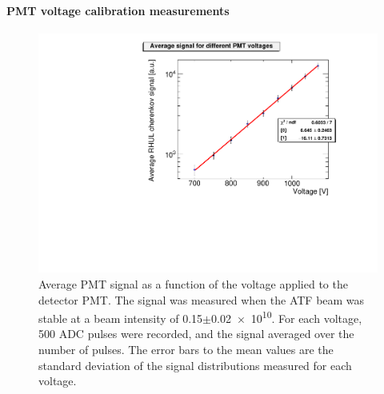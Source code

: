 \paragraph{PMT voltage calibration measurements}
\begin{figure}
\centering
\includegraphics[width=\textwidth]{Figures/VoltageNormalization_totError.pdf}
\caption[RHUL Cherenkov detector voltage calibration]{Average PMT signal as a function of the voltage applied to the detector PMT. The signal was measured when the ATF beam was stable at a beam intensity of \num{0.15}$\pm$\num{0.02e10}. For each voltage, 500 ADC pulses were recorded, and the signal averaged over the number of pulses. The error bars to the mean values are the standard deviation of the signal distributions measured for each voltage.}
\label{fig:VoltageNormalization}
\end{figure}

